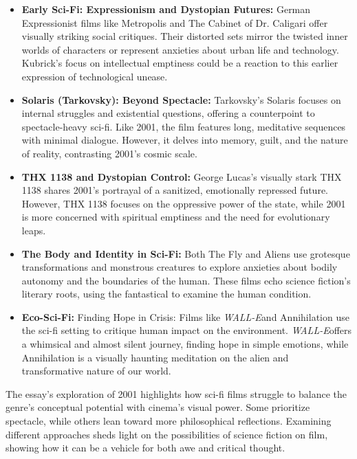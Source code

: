 \documentclass[11pt,fleqn]{book}
\begin{document}
\begin{itemize}
\item \textbf{Early Sci-Fi: Expressionism and Dystopian Futures:}  German Expressionist films like Metropolis and The Cabinet of Dr. Caligari offer visually striking social critiques. Their distorted sets mirror the twisted inner worlds of characters or represent anxieties about urban life and technology. Kubrick's focus on intellectual emptiness could be a reaction to this earlier expression of technological unease.

\item \textbf{Solaris (Tarkovsky): Beyond Spectacle:}  Tarkovsky's Solaris focuses on internal struggles and existential questions, offering a counterpoint to spectacle-heavy sci-fi. Like 2001, the film features long, meditative sequences with minimal dialogue. However, it delves into memory, guilt, and the nature of reality, contrasting  2001's cosmic scale.

\item \textbf{THX 1138 and Dystopian Control:} George Lucas's visually stark THX 1138 shares 2001's portrayal of a sanitized, emotionally repressed future. However, THX 1138 focuses on the oppressive power of the state, while  2001 is more concerned with spiritual emptiness and the need for evolutionary leaps.

\item \textbf{The Body and Identity in Sci-Fi:} Both The Fly and Aliens use grotesque transformations and monstrous creatures to explore anxieties about bodily autonomy and the boundaries of the human. These films echo science fiction's literary roots, using the fantastical to examine the human condition. 

\item \textbf{Eco-Sci-Fi: }Finding Hope in Crisis: Films like \textit{WALL-E}and Annihilation use the sci-fi setting to critique human impact on the environment. \textit{WALL-E}offers a whimsical and almost silent journey, finding hope in simple emotions, while Annihilation is a visually haunting meditation on the alien and transformative nature of our world.
\end{itemize}

\vspace{5pt}

The essay's exploration of 2001 highlights how sci-fi films struggle to balance the genre's conceptual potential with cinema's visual power.  Some prioritize spectacle, while others lean toward more philosophical reflections. Examining different approaches sheds light on the possibilities of science fiction on film, showing how it can be a vehicle for both awe and critical thought. 
\end{document}
